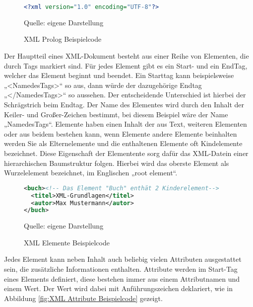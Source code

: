 \begin{figure}[H]
\centering
\begin{minipage}{0.95\textwidth}
\begin{lstlisting}[language=XML]
<?xml version="1.0" encoding="UTF-8"?>
\end{lstlisting}
\end{minipage}
\caption{XML Prolog Beispielcode}
\label{fig:XML Prolog Beispielcode}
    {Quelle: eigene Darstellung}
\end{figure}


Der Hauptteil eines \ac{XML}-Dokument besteht aus einer Reihe von Elementen, die durch Tags markiert sind.
Für jedes Element gibt es ein Start- und ein EndTag, welcher das Element beginnt und beendet.
Ein Starttag kann beispielsweise „<NamedesTags>“ so aus, dann würde der dazugehörige Endtag „</NamedesTags>“ so aussehen.
Der entscheidende Unterschied ist hierbei der Schrägstrich beim Endtag.
Der Name des Elementes wird durch den Inhalt der Keiler- und Großer-Zeichen bestimmt, bei diesem Beispiel wäre der Name „NamedesTags“.
Elemente haben einen Inhalt der aus Text, weiteren Elementen oder aus beidem bestehen kann,
wenn Elemente andere Elemente beinhalten werden Sie als Elternelemente und die enthaltenen Elemente oft Kindelemente bezeichnet.
Diese Eigenschaft der Elementente sorg dafür das \ac{XML}-Datein einer hierarchischen Baumstruktur folgen.
Hierbei wird das oberste Element als Wurzelelement bezeichnet, im Englischen „root element“.\cite*[10-14]{Becher2022}


\begin{figure}[H]
\centering
\begin{minipage}{0.95\textwidth}
\begin{lstlisting}[language=XML]
<buch><!-- Das Element "Buch" enthät 2 Kinderelement-->
  <titel>XML-Grundlagen</titel>
  <autor>Max Mustermann</autor>
</buch>
\end{lstlisting}
\end{minipage}
\caption{XML Elemente Beispielcode}
\label{fig:XML Elemente Beispielcode}
    {Quelle: eigene Darstellung}
\end{figure}

Jedes Element kann neben Inhalt auch beliebig vielen Attributen ausgestattet sein, die zusätzliche Informationen enthalten.
Attribute werden im Start-Tag eines Elements definiert, diese bestehen immer aus einem Attributnamen und einem Wert.
Der Wert wird dabei mit Anführungszeichen deklariert, wie in Abbildung \ref{fig:XML Attribute Beispielcode} gezeigt. \cite*[10-14]{Becher2022}


